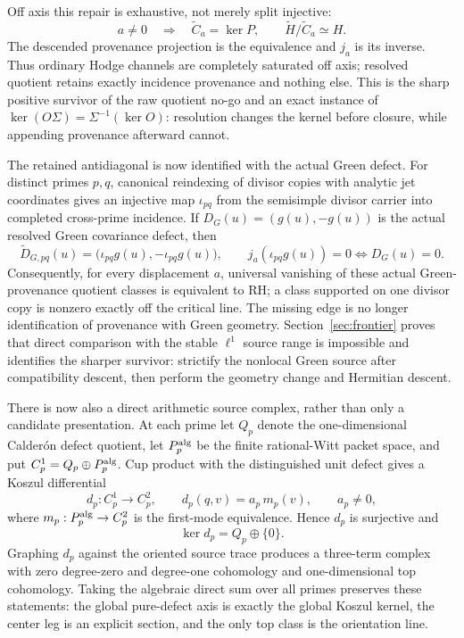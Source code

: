 \documentclass[11pt]{article}
\theoremstyle{definition}
\theoremstyle{remark}
\begin{document}
Off axis this repair is exhaustive, not merely split injective:
\[
          a\ne0\quad\Longrightarrow\quad
          \widetilde C_a=\ker P,
          \qquad
          \widetilde H/\widetilde C_a\simeq H.
\tag{3.7cda}\label{eq:resolved-provenance-saturation}
\]
The descended provenance projection is the equivalence and \(j_a\) is its
inverse.  Thus ordinary Hodge channels are completely saturated off axis;
resolved quotient retains exactly incidence provenance and nothing else.
This is the sharp positive survivor of the raw quotient no-go and an exact
instance of \(\ker(O\Sigma)=\Sigma^{-1}(\ker O)\): resolution changes the
kernel before closure, while appending provenance afterward cannot.

The retained antidiagonal is now identified with the actual Green defect.
For distinct primes \(p,q\), canonical reindexing of divisor copies with
analytic jet coordinates gives an injective map \(\iota_{pq}\) from the
semisimple divisor carrier into completed cross-prime incidence.  If
\(D_G(u)=(g(u),-g(u))\) is the actual resolved Green covariance defect, then
\[
 \widetilde D_{G,pq}(u)
   =\bigl(\iota_{pq}g(u),-\iota_{pq}g(u)\bigr),\qquad
 j_a\!\left(\iota_{pq}g(u)\right)=0
   \Longleftrightarrow D_G(u)=0.
\tag{3.7ce}\label{eq:actual-green-provenance}
\]
Consequently, for every displacement \(a\), universal vanishing of these
actual Green-provenance quotient classes is equivalent to RH; a class
supported on one divisor copy is nonzero exactly off the critical line.
The missing edge is no longer identification of provenance with Green
geometry.  Section~\ref{sec:frontier} proves that direct comparison with the
stable \(\ell^1\) source range is impossible and identifies the sharper
survivor: strictify the nonlocal Green source after compatibility descent,
then perform the geometry change and Hermitian descent.

There is now also a direct arithmetic source complex, rather than only a
candidate presentation.  At each prime let \(Q_p\) denote the one-dimensional
Calder\'on defect quotient, let \(P_p^{\rm alg}\) be the finite rational-Witt
packet space, and put \(C_p^1=Q_p\oplus P_p^{\rm alg}\).  Cup product with
the distinguished unit defect gives a Koszul differential
\[
 d_p:C_p^1\longrightarrow C_p^2,\qquad
 d_p(q,v)=a_p\,m_p(v),\qquad a_p\ne0,
\tag{3.7cf}\label{eq:calderon-witt-koszul}
\]
where \(m_p:P_p^{\rm alg}\to C_p^2\) is the first-mode equivalence.  Hence
\(d_p\) is surjective and
\[
              \ker d_p=Q_p\oplus\{0\}.
\tag{3.7cg}\label{eq:calderon-witt-kernel}
\]
Graphing \(d_p\) against the oriented source trace produces a three-term
complex with zero degree-zero and degree-one cohomology and one-dimensional
top cohomology.  Taking the algebraic direct sum over all primes preserves
these statements: the global pure-defect axis is exactly the global Koszul
kernel, the center leg is an explicit section, and the only top class is the
orientation line.
\end{document}
